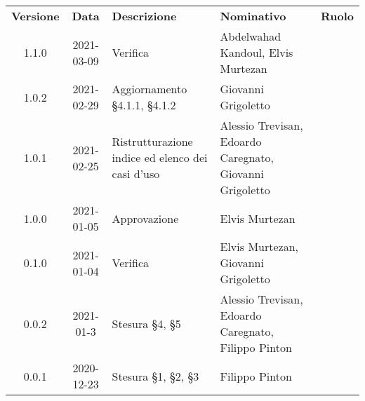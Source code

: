 
{
\renewcommand{\arraystretch}{1.5}
\centering
\begin{longtable}{ c c  C{3.5cm}  C{4cm}  c }
    \rowcolor{\primaryColor}
    \textcolor{\secondaryColor}{
    \textbf{Versione}}     & \textcolor{\secondaryColor}{\textbf{Data}}       & \textcolor{\secondaryColor}
    {\textbf{Descrizione}} & \textcolor{\secondaryColor}{\textbf{Nominativo}} & \textcolor{\secondaryColor}{\textbf{Ruolo}}                                                                         \\


    1.1.0                  & 2021-03-09                                       & Verifica                         & Abdelwahad Kandoul, Elvis Murtezan                                      & \verificatore{}    \\

    
    1.0.2                  & 2021-02-29                                       & Aggiornamento §4.1.1, §4.1.2                         & Giovanni Grigoletto                                      & \analista{}    \\

    1.0.1                  & 2021-02-25                                        & Ristrutturazione indice ed elenco dei casi d'uso                              & Alessio Trevisan, Edoardo Caregnato, Giovanni Grigoletto & \analista{}    \\

    1.0.0                  & 2021-01-05                                       & Approvazione                                & Elvis Murtezan                                      & \responsabile{} \\

    0.1.0                  & 2021-01-04                                       & Verifica                                    & Elvis Murtezan, Giovanni Grigoletto                 & \verificatore{} \\

    0.0.2                  & 2021-01-3                                        & Stesura §4, §5                              & Alessio Trevisan, Edoardo Caregnato, Filippo Pinton & \analista{}    \\

    0.0.1                  & 2020-12-23                                       & Stesura §1, §2, §3                          & Filippo Pinton                                      & \analista{}    \\
\end{longtable}
}